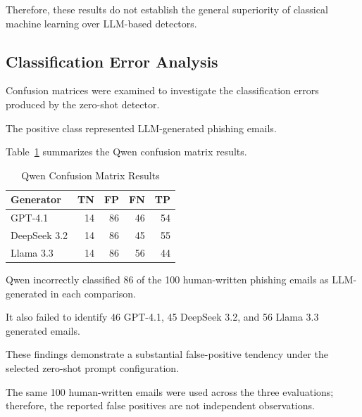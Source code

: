 \documentclass[sigconf,nonacm]{acmart}
\begin{document}
Therefore, these results do not establish
the general superiority of classical
machine learning over LLM-based detectors.


\subsection{Classification Error Analysis}

Confusion matrices were examined to
investigate the classification errors
produced by the zero-shot detector.

The positive class represented
LLM-generated phishing emails.

Table~\ref{tab:qwen_errors} summarizes
the Qwen confusion matrix results.

\begin{table}[t]
\centering
\caption{Qwen Confusion Matrix Results}
\label{tab:qwen_errors}
\small
\begin{tabular}{lrrrr}
\toprule
Generator & TN & FP & FN & TP \\
\midrule
GPT-4.1 & 14 & 86 & 46 & 54 \\
DeepSeek 3.2 & 14 & 86 & 45 & 55 \\
Llama 3.3 & 14 & 86 & 56 & 44 \\
\bottomrule
\end{tabular}
\end{table}

Qwen incorrectly classified 86 of the
100 human-written phishing emails as
LLM-generated in each comparison.

It also failed to identify 46 GPT-4.1,
45 DeepSeek 3.2, and 56 Llama 3.3
generated emails.

These findings demonstrate a substantial
false-positive tendency under the selected
zero-shot prompt configuration.

The same 100 human-written emails were
used across the three evaluations;
therefore, the reported false positives
are not independent observations.


\end{document}
